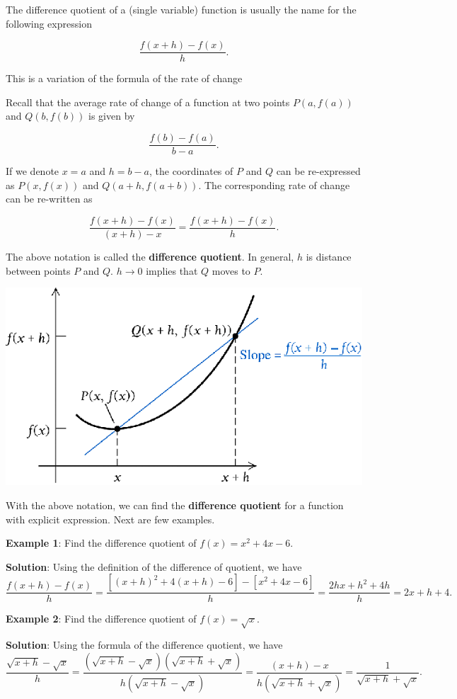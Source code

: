 \documentclass[
]{book}
\begin{document}
The difference quotient of a (single variable) function is usually the name for the following expression

\[
\frac{f(x+h)-f(x)}{h}.
\]

This is a variation of the formula of the rate of change

Recall that the average rate of change of a function at two points \(P(a,f(a))\) and \(Q(b, f(b))\) is given by

\[
\frac{f(b)-f(a)}{b -a}.
\]

If we denote \(x = a\) and \(h = b-a\), the coordinates of \(P\) and \(Q\) can be re-expressed as \(P(x, f(x))\) and \(Q(a+h, f(a+b))\). The corresponding rate of change can be re-written as

\[
\frac{f(x+h)-f(x)}{(x+h) - x} = \frac{f(x+h)-f(x)}{h}.
\]

The above notation is called the \textbf{difference quotient}. In general, \(h\) is distance between points \(P\) and \(Q\). \(h \to 0\) implies that \(Q\) moves to \(P\).

\begin{center}\includegraphics[width=0.65\linewidth]{img02/w02note-DifferenceQuotient} \end{center}

With the above notation, we can find the \textbf{difference quotient} for a function with explicit expression. Next are few examples.

\hfill\break

\textbf{Example 1}: Find the difference quotient of \(f(x) = x^2 + 4x -6\).

\textbf{Solution}: Using the definition of the difference of quotient, we have
\[
\frac{f(x+h)-f(x)}{h} = \frac{[(x+h)^2 + 4(x+h) -6]-[x^2+4x-6]}{h}=\frac{2hx+h^2+4h}{h}=2x+h+4.
\]

\hfill\break

\textbf{Example 2}: Find the difference quotient of \(f(x) = \sqrt{x}\).

\textbf{Solution}: Using the formula of the difference quotient, we have
\[
\frac{\sqrt{x+h}-\sqrt{x}}{h} = \frac{(\sqrt{x+h}-\sqrt{x})(\sqrt{x+h}+\sqrt{x})}{h(\sqrt{x+h}-\sqrt{x})} = \frac{(x+h)-x}{{h(\sqrt{x+h}+\sqrt{x})}} = \frac{1}{\sqrt{x+h}+\sqrt{x}}.
\]
\end{document}
